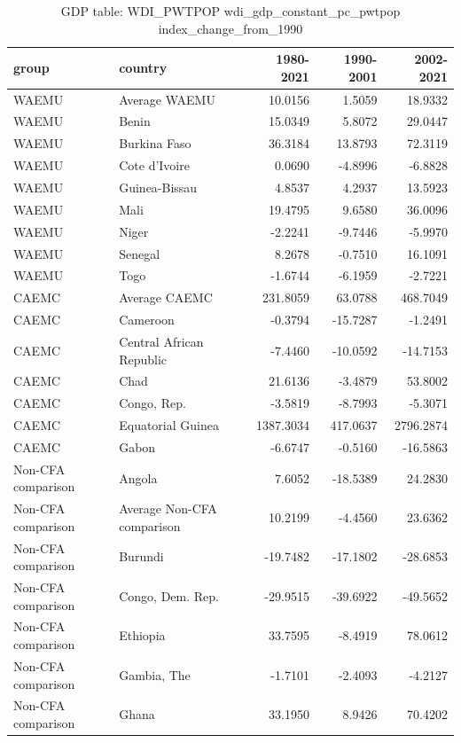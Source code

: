 \begin{table}

\caption{GDP table: WDI_PWTPOP wdi_gdp_constant_pc_pwtpop index_change_from_1990}
\centering
\begin{tabular}[t]{llrrr}
\toprule
group & country & 1980-2021 & 1990-2001 & 2002-2021\\
\midrule
WAEMU & Average WAEMU & 10.0156 & 1.5059 & 18.9332\\
WAEMU & Benin & 15.0349 & 5.8072 & 29.0447\\
WAEMU & Burkina Faso & 36.3184 & 13.8793 & 72.3119\\
WAEMU & Cote d'Ivoire & 0.0690 & -4.8996 & -6.8828\\
WAEMU & Guinea-Bissau & 4.8537 & 4.2937 & 13.5923\\
\addlinespace
WAEMU & Mali & 19.4795 & 9.6580 & 36.0096\\
WAEMU & Niger & -2.2241 & -9.7446 & -5.9970\\
WAEMU & Senegal & 8.2678 & -0.7510 & 16.1091\\
WAEMU & Togo & -1.6744 & -6.1959 & -2.7221\\
CAEMC & Average CAEMC & 231.8059 & 63.0788 & 468.7049\\
\addlinespace
CAEMC & Cameroon & -0.3794 & -15.7287 & -1.2491\\
CAEMC & Central African Republic & -7.4460 & -10.0592 & -14.7153\\
CAEMC & Chad & 21.6136 & -3.4879 & 53.8002\\
CAEMC & Congo, Rep. & -3.5819 & -8.7993 & -5.3071\\
CAEMC & Equatorial Guinea & 1387.3034 & 417.0637 & 2796.2874\\
\addlinespace
CAEMC & Gabon & -6.6747 & -0.5160 & -16.5863\\
Non-CFA comparison & Angola & 7.6052 & -18.5389 & 24.2830\\
Non-CFA comparison & Average Non-CFA comparison & 10.2199 & -4.4560 & 23.6362\\
Non-CFA comparison & Burundi & -19.7482 & -17.1802 & -28.6853\\
Non-CFA comparison & Congo, Dem. Rep. & -29.9515 & -39.6922 & -49.5652\\
\addlinespace
Non-CFA comparison & Ethiopia & 33.7595 & -8.4919 & 78.0612\\
Non-CFA comparison & Gambia, The & -1.7101 & -2.4093 & -4.2127\\
Non-CFA comparison & Ghana & 33.1950 & 8.9426 & 70.4202\\

\end{tabular}
\end{table}

